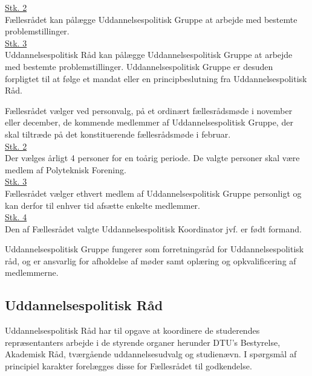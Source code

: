 \begin{list}
\underline{Stk. 2}\\
Fællesrådet kan pålægge Uddannelsespolitisk Gruppe at arbejde med bestemte problemstillinger.\\

\underline{Stk. 3}\\
Uddannelsespolitisk Råd kan pålægge Uddannelsespolitisk Gruppe at arbejde med bestemte problemstillinger. Uddannelsespolitisk Gruppe er desuden forpligtet til at følge et mandat eller en
principbeslutning fra Uddannelsespolitisk Råd.\\

\item Fællesrådet vælger ved personvalg, på et ordinært fællesrådsmøde i november eller december, de kommende medlemmer af Uddannelsespolitisk Gruppe, der skal tiltræde på det konstituerende fællesrådsmøde i februar.\\

\underline{Stk. 2}\\
Der vælges årligt 4 personer for en toårig periode. De valgte personer skal være medlem af Polyteknisk Forening.\\

\underline{Stk. 3}\\ Fællesrådet vælger ethvert medlem af Uddannelsespolitisk Gruppe personligt og kan derfor til enhver tid afsætte enkelte medlemmer.\\

\underline{Stk. 4}\\ 
Den af Fællesrådet valgte Uddannelsespolitisk Koordinator jvf.  er født formand.\\

\item Uddannelsespolitisk Gruppe fungerer som forretningsråd for Uddannelsespolitisk råd, og er ansvarlig for afholdelse af møder samt oplæring og opkvalificering af medlemmerne.\\

\subsection{Uddannelsespolitisk Råd}
\label{L:kap:upr}
\item Uddannelsespolitisk Råd har til opgave at koordinere de studerendes repræsentanters arbejde i de styrende organer herunder DTU’s Bestyrelse, Akademisk Råd, tværgående uddannelsesudvalg og studienævn. I spørgsmål af principiel karakter forelægges disse for Fællesrådet til godkendelse.\\


\end{list}
